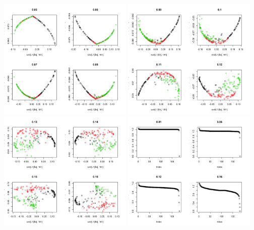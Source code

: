 \documentclass[11pt]{article}
\begin{document}
\clearpage

\noindent \includegraphics[width=0.48\textwidth]{thresh1.png}
\includegraphics[width=0.48\textwidth]{thresh2.png}\\
\includegraphics[width=0.48\textwidth]{thresh3.png}
\includegraphics[width=0.48\textwidth]{sv.png}
\end{document}
